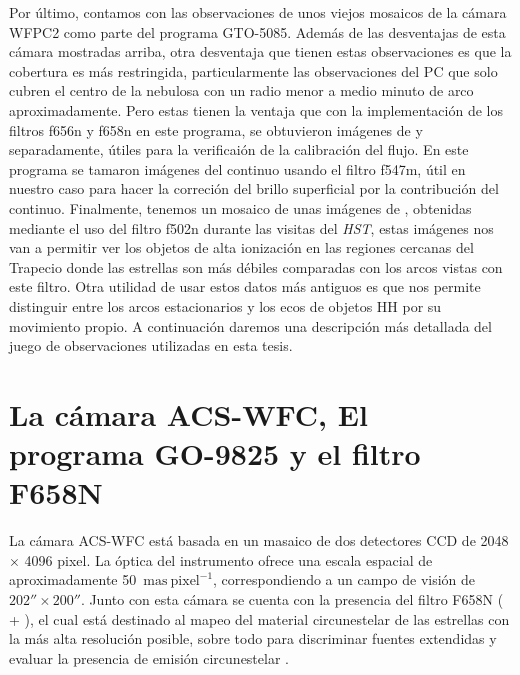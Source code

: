 Por último, contamos con  las observaciones de unos viejos mosaicos de la cámara WFPC2 como parte del programa GTO-5085. Además de las desventajas de esta cámara mostradas arriba, otra desventaja que tienen estas observaciones es que la cobertura es más restringida, particularmente las observaciones del PC que solo cubren el centro de la nebulosa con un radio menor a medio minuto de arco aproximadamente. Pero estas tienen la ventaja que con la implementación de los filtros f656n y f658n en este programa, se obtuvieron imágenes de \ha{} y \nii{} separadamente, útiles para la verificaión de la calibración del flujo. En este programa se tamaron imágenes del continuo usando el filtro f547m, útil en nuestro caso para hacer la correción del brillo superficial por la contribución del continuo. Finalmente, tenemos un mosaico de unas imágenes de \oiii{}, obtenidas mediante el uso del filtro f502n durante las visitas del \textit{HST}, estas imágenes nos van a permitir ver los objetos de alta ionización en las regiones cercanas del Trapecio donde las estrellas son más débiles comparadas con los arcos vistas con este filtro. Otra utilidad de usar estos datos más antiguos es que nos permite distinguir entre los arcos estacionarios y los ecos de objetos HH por su movimiento propio. A continuación daremos una descripción más detallada del juego de observaciones utilizadas en esta tesis.        

\section{La cámara ACS-WFC, El programa GO-9825 y el filtro F658N }
\label{sec:acs}

La cámara ACS-WFC está basada en un masaico de dos detectores CCD de 2048 \(\times\) 4096 pixel. La óptica del instrumento ofrece una escala espacial de aproximadamente 50~\(\mathrm{mas~pixel^{-1}}\), correspondiendo a un campo de visión  de \(202'' \times 200''\). Junto con esta cámara se cuenta con la presencia del filtro F658N (\ha{} + \nii{}), el cual está destinado al mapeo del material circunestelar de las estrellas con la más alta resolución posible, sobre todo para discriminar fuentes extendidas y evaluar la presencia de emisión circunestelar \citep{Robberto:2013a}.\\

